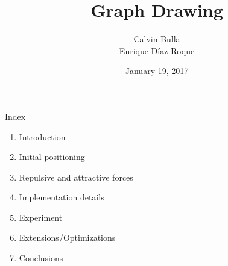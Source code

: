 \documentclass{beamer}
\title{Graph Drawing}
\date{January 19, 2017}
\author{Calvin Bulla \\ Enrique Díaz Roque}
\institute{Algorithms for VLSI}
\begin{document}
\maketitle


\begin{frame}{Index}
\begin{enumerate}
\item Introduction
\item Initial positioning
\item Repulsive and attractive forces
\item Implementation details
\item Experiment
\item Extensions/Optimizations
\item Conclusions
\end{enumerate}
\end{frame}
\end{document}
